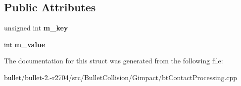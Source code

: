 \subsection*{Public Attributes}
\begin{DoxyCompactItemize}
\item 
\hypertarget{struct_c_o_n_t_a_c_t___k_e_y___t_o_k_e_n_aa11c41597f20668b4d67b1c2c14ddb53}{unsigned int {\bfseries m\+\_\+key}}\label{struct_c_o_n_t_a_c_t___k_e_y___t_o_k_e_n_aa11c41597f20668b4d67b1c2c14ddb53}

\item 
\hypertarget{struct_c_o_n_t_a_c_t___k_e_y___t_o_k_e_n_a22a1b73554e87881505f79d2422b3501}{int {\bfseries m\+\_\+value}}\label{struct_c_o_n_t_a_c_t___k_e_y___t_o_k_e_n_a22a1b73554e87881505f79d2422b3501}

\end{DoxyCompactItemize}


The documentation for this struct was generated from the following file\+:\begin{DoxyCompactItemize}
\item 
bullet/bullet-\/2.-\/r2704/src/\+Bullet\+Collision/\+Gimpact/bt\+Contact\+Processing.\+cpp\end{DoxyCompactItemize}
